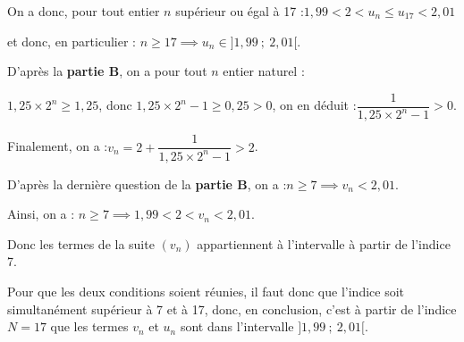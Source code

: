 	On a donc, pour tout entier $n$ supérieur ou égal à 17 :\quad $ 1,99 < 2 < u_n \leqslant u_{17} < 2,01$

	et donc, en particulier : \quad $n\geqslant 17 \implies u_n \in ]1,99~;~2,01[$.

	D'après la \textbf{partie B}, on a pour tout $n$ entier naturel :

	$1,25\times 2^n \geqslant 1,25$, \quad donc \quad $1,25 \times 2^n - 1 \geqslant 0,25 > 0$,
	\quad on en déduit :\quad $\dfrac{1}{1,25\times 2^n - 1} > 0$.

	Finalement, on a :\quad $v_n = 2 + \dfrac{1}{1,25\times 2^n - 1} > 2$.

	D'après la dernière question de la \textbf{partie B}, on a :\quad $n \geqslant 7 \implies v_n < 2,01$.

	Ainsi, on a : $n \geqslant 7 \implies 1,99 < 2 < v_n < 2,01$.

	Donc les termes de la suite $(v_n)$ appartiennent à l'intervalle à partir de l'indice 7.

	Pour que les deux conditions soient réunies, il faut donc que l'indice soit simultanément supérieur à 7 et à 17, donc, en conclusion, c'est à partir de l'indice $N = 17$ que les termes $v_n$ et $u_n$ sont dans l'intervalle $]1,99 ~;~ 2,01[$.


	\bigskip
